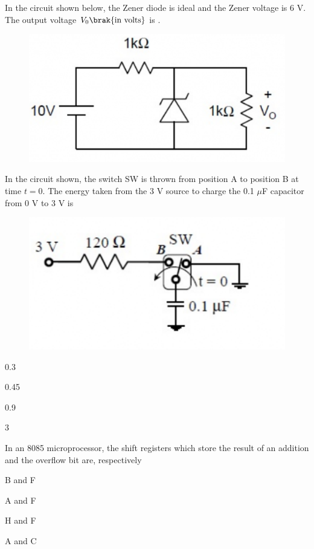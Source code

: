     \item In the circuit shown below, the Zener diode is ideal and the Zener voltage is 6 V. The output voltage $V_{0} \brak{\text{in volts}}$ is \underline{\hspace{2cm}}.
    \begin{figure}[H]
        \centering
        \includegraphics[width=0.4\columnwidth]{figs/q22.png}
        \caption*{}
        \label{fig:q22}
    \end{figure}
    
    \hfill{}

    \item In the circuit shown, the switch SW is thrown from position A to position B at time $t=0$. The energy  taken from the 3 V source to charge the 0.1 $\mu$F capacitor from 0 V to 3 V is
    \begin{figure}[H]
        \centering
        \includegraphics[width=0.5\columnwidth]{figs/q23.png}
        \caption*{}
        \label{fig:q23}
    \end{figure}
    \begin{enumerate}
        \begin{multicols}{4}
            \item 0.3
            \item 0.45
            \item 0.9
            \item 3
        \end{multicols}
    \end{enumerate}
    
    \hfill{}

    \item In an 8085 microprocessor, the shift registers which store the result of an addition and the overflow bit are, respectively
    \begin{enumerate}
        \begin{multicols}{2}
            \item B and F
            \item A and F
            \item H and F
            \item A and C
        \end{multicols}
    \end{enumerate}
    
